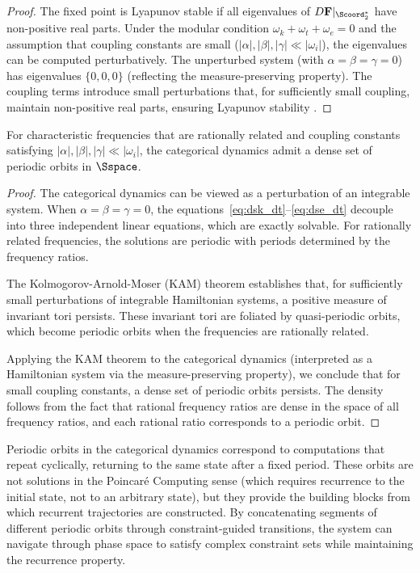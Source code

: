 \begin{proof}
The fixed point is Lyapunov stable if all eigenvalues of $D\mathbf{F}|_{\Scoord_2^*}$ have non-positive real parts. Under the modular condition $\omega_k + \omega_t + \omega_e = 0$ and the assumption that coupling constants are small ($|\alpha|, |\beta|, |\gamma| \ll |\omega_i|$), the eigenvalues can be computed perturbatively. The unperturbed system (with $\alpha = \beta = \gamma = 0$) has eigenvalues $\{0, 0, 0\}$ (reflecting the measure-preserving property). The coupling terms introduce small perturbations that, for sufficiently small coupling, maintain non-positive real parts, ensuring Lyapunov stability \citep{khalil2002nonlinear}.
\end{proof}



\begin{theorem}
\label{thm:periodic_orbits}
For characteristic frequencies that are rationally related and coupling constants satisfying $|\alpha|, |\beta|, |\gamma| \ll |\omega_i|$, the categorical dynamics admit a dense set of periodic orbits in $\Sspace$.
\end{theorem}

\begin{proof}
The categorical dynamics can be viewed as a perturbation of an integrable system. When $\alpha = \beta = \gamma = 0$, the equations~\eqref{eq:dsk_dt}--\eqref{eq:dse_dt} decouple into three independent linear equations, which are exactly solvable. For rationally related frequencies, the solutions are periodic with periods determined by the frequency ratios.

The Kolmogorov-Arnold-Moser (KAM) theorem \citep{arnold1963proof} establishes that, for sufficiently small perturbations of integrable Hamiltonian systems, a positive measure of invariant tori persists. These invariant tori are foliated by quasi-periodic orbits, which become periodic orbits when the frequencies are rationally related.

Applying the KAM theorem to the categorical dynamics (interpreted as a Hamiltonian system via the measure-preserving property), we conclude that for small coupling constants, a dense set of periodic orbits persists. The density follows from the fact that rational frequency ratios are dense in the space of all frequency ratios, and each rational ratio corresponds to a periodic orbit.
\end{proof}

\begin{remark}
\label{rem:periodic_orbits_computation}
Periodic orbits in the categorical dynamics correspond to computations that repeat cyclically, returning to the same state after a fixed period. These orbits are not solutions in the Poincaré Computing sense (which requires recurrence to the initial state, not to an arbitrary state), but they provide the building blocks from which recurrent trajectories are constructed. By concatenating segments of different periodic orbits through constraint-guided transitions, the system can navigate through phase space to satisfy complex constraint sets while maintaining the recurrence property.
\end{remark}

